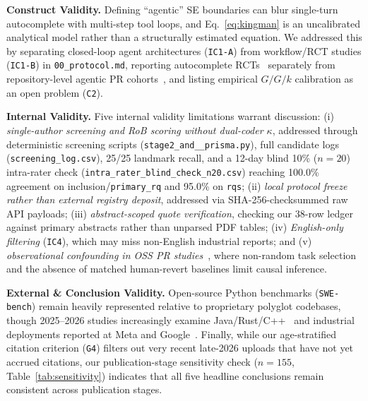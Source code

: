 \documentclass[10pt,twocolumn,a4paper]{article}
\makeatletter
\renewcommand\section{\@startsection{section}{1}{\z@}{-2.8ex \@plus -0.6ex \@minus -0.2ex}{1.4ex \@plus 0.2ex}{\normalfont\Large\bfseries\raggedright}}
\makeatother
\begin{document}
\section{Threats to Validity}
\label{sec:threats}

\textbf{Construct Validity.} Defining ``agentic'' SE boundaries can blur single-turn autocomplete with multi-step tool loops, and Eq.~\eqref{eq:kingman} is an uncalibrated analytical model rather than a structurally estimated equation. We addressed this by separating closed-loop agent architectures (\texttt{IC1-A}) from workflow/RCT studies (\texttt{IC1-B}) in \texttt{00\_protocol.md}, reporting autocomplete RCTs~\cite{cui2026effects,peng2023impact} separately from repository-level agentic PR cohorts~\cite{watanabe2025use,gong2026analyzing,li2026aidev,adams2026automating}, and listing empirical $G/G/k$ calibration as an open problem (\texttt{C2}).

\textbf{Internal Validity.} Five internal validity limitations warrant discussion: (i) \emph{single-author screening and RoB scoring without dual-coder $\kappa$}, addressed through deterministic screening scripts (\texttt{stage2\_\allowbreak and\_\_\allowbreak prisma.\allowbreak py}), full candidate logs (\texttt{screening\_log.csv}), 25/25 landmark recall, and a 12-day blind 10\% ($n=20$) intra-rater check (\texttt{intra\_\allowbreak rater\_\allowbreak blind\_\allowbreak check\_\allowbreak n20.\allowbreak csv}) reaching 100.0\% agreement on inclusion/\texttt{primary\_rq} and 95.0\% on \texttt{rqs}; (ii) \emph{local protocol freeze rather than external registry deposit}, addressed via SHA-256-checksummed raw API payloads; (iii) \emph{abstract-scoped quote verification}, checking our 38-row ledger against primary abstracts rather than unparsed PDF tables; (iv) \emph{English-only filtering} (\texttt{IC4}), which may miss non-English industrial reports; and (v) \emph{observational confounding in OSS PR studies}~\cite{gong2026analyzing,oukhay2026code,watanabe2025use}, where non-random task selection and the absence of matched human-revert baselines limit causal inference.

\textbf{External \& Conclusion Validity.} Open-source Python benchmarks (\texttt{SWE-bench}) remain heavily represented relative to proprietary polyglot codebases, though 2025--2026 studies increasingly examine Java/Rust/C++~\cite{zan2025multiswebench,horikawa2025agentic} and industrial deployments reported at Meta and Google~\cite{adams2026automating,rondon2025evaluating,alshahwan2024automated}. Finally, while our age-stratified citation criterion (\texttt{G4}) filters out very recent late-2026 uploads that have not yet accrued citations, our publication-stage sensitivity check ($n=155$, Table~\ref{tab:sensitivity}) indicates that all five headline conclusions remain consistent across publication stages.
\end{document}
